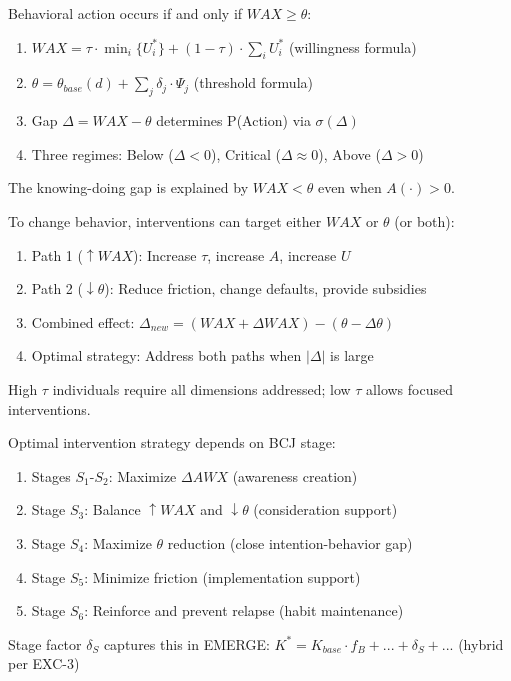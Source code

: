 \begin{theorem}
Behavioral action occurs if and only if $WAX \geq \theta$:
\begin{enumerate}
\item $WAX = \tau \cdot \min_i\{U^*_i\} + (1-\tau) \cdot \sum_i U^*_i$ (willingness formula)
\item $\theta = \theta_{base}(d) + \sum_j \delta_j \cdot \Psi_j$ (threshold formula)
\item Gap $\Delta = WAX - \theta$ determines P(Action) via $\sigma(\Delta)$
\item Three regimes: Below ($\Delta < 0$), Critical ($\Delta \approx 0$), Above ($\Delta > 0$)
\end{enumerate}
The knowing-doing gap is explained by $WAX < \theta$ even when $A(\cdot) > 0$.
\end{theorem}

\begin{theorem}
To change behavior, interventions can target either $WAX$ or $\theta$ (or both):
\begin{enumerate}
\item Path 1 ($\uparrow WAX$): Increase $\tau$, increase $A$, increase $U$
\item Path 2 ($\downarrow \theta$): Reduce friction, change defaults, provide subsidies
\item Combined effect: $\Delta_{new} = (WAX + \Delta WAX) - (\theta - \Delta\theta)$
\item Optimal strategy: Address both paths when $|\Delta|$ is large
\end{enumerate}
High $\tau$ individuals require all dimensions addressed; low $\tau$ allows focused interventions.
\end{theorem}

\begin{theorem}
Optimal intervention strategy depends on BCJ stage:
\begin{enumerate}
\item Stages $S_1$-$S_2$: Maximize $\Delta AWX$ (awareness creation)
\item Stage $S_3$: Balance $\uparrow WAX$ and $\downarrow \theta$ (consideration support)
\item Stage $S_4$: Maximize $\theta$ reduction (close intention-behavior gap)
\item Stage $S_5$: Minimize friction (implementation support)
\item Stage $S_6$: Reinforce and prevent relapse (habit maintenance)
\end{enumerate}
Stage factor $\delta_S$ captures this in EMERGE: $K^* = K_{base} \cdot f_B + ... + \delta_S + ...$ (hybrid per EXC-3)
\end{theorem}

